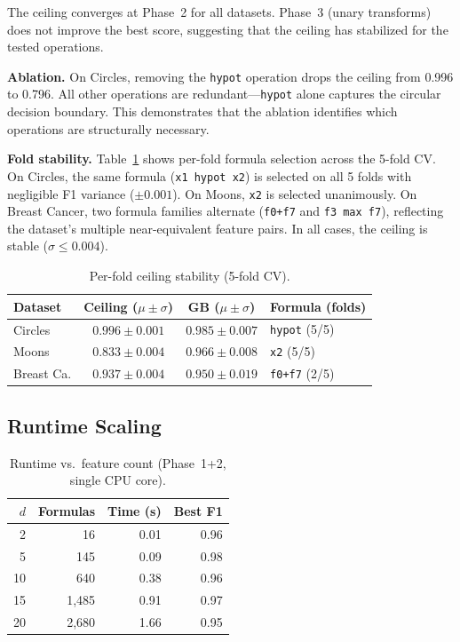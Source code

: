 \documentclass[journal]{IEEEtran}
\begin{document}
The ceiling converges at Phase~2 for all datasets. Phase~3 (unary
transforms) does not improve the best score, suggesting that the ceiling
has stabilized for the tested operations.

\textbf{Ablation.} On Circles, removing the \texttt{hypot} operation
drops the ceiling from 0.996 to 0.796. All other operations are
redundant---\texttt{hypot} alone captures the circular decision
boundary. This demonstrates that the ablation identifies which
operations are structurally necessary.

\textbf{Fold stability.} Table~\ref{tab:folds} shows per-fold
formula selection across the 5-fold CV. On Circles, the same formula
(\texttt{x1 hypot x2}) is selected on all 5 folds with negligible
F1 variance ($\pm 0.001$). On Moons, \texttt{x2} is selected
unanimously. On Breast Cancer, two formula families alternate
(\texttt{f0+f7} and \texttt{f3 max f7}), reflecting the dataset's
multiple near-equivalent feature pairs. In all cases, the ceiling
is stable ($\sigma \leq 0.004$).

\begin{table}[h]
\caption{Per-fold ceiling stability (5-fold CV).}
\label{tab:folds}
\scriptsize
\begin{tabular}{@{}lccl@{}}
\toprule
Dataset & Ceiling ($\mu \pm \sigma$) & GB ($\mu \pm \sigma$) & Formula (folds) \\
\midrule
Circles & $0.996 \pm 0.001$ & $0.985 \pm 0.007$ & \texttt{hypot} (5/5) \\
Moons & $0.833 \pm 0.004$ & $0.966 \pm 0.008$ & \texttt{x2} (5/5) \\
Breast Ca. & $0.937 \pm 0.004$ & $0.950 \pm 0.019$ & \texttt{f0+f7} (2/5) \\
\bottomrule
\end{tabular}
\end{table}

\subsection{Runtime Scaling}

\begin{table}[h]
\caption{Runtime vs.\ feature count (Phase~1+2, single CPU core).}
\label{tab:scaling}
\small
\begin{tabular}{rrrr}
\toprule
$d$ & Formulas & Time (s) & Best F1 \\
\midrule
2 & 16 & 0.01 & 0.96 \\
5 & 145 & 0.09 & 0.98 \\
10 & 640 & 0.38 & 0.96 \\
15 & 1{,}485 & 0.91 & 0.97 \\
20 & 2{,}680 & 1.66 & 0.95 \\
\bottomrule
\end{tabular}
\end{table}
\end{document}
